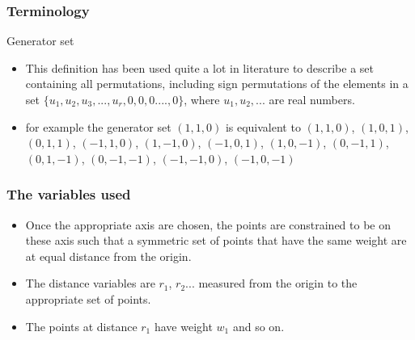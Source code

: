 \documentclass[11pt]{beamer}
\begin{document}
\begin{frame}
\frametitle{Terminology}
\begin{block}{Generator set}
\begin{itemize}[<+->]
\item This definition has been used quite a lot in literature to describe a set containing all permutations, including sign permutations of the elements in a set $\{u_1,u_2,u_3,...,u_r,0,0,0....,0\}$, where $u_1,u_2,...$ are real numbers.
\item for example the generator set $(1,1,0)$ is equivalent to $(1,1,0)$, $(1,0,1)$, $(0,1,1)$, $(-1,1,0)$, $(1,-1,0)$, $(-1,0,1)$, $(1,0,-1)$, $(0,-1,1)$, $(0,1,-1)$, $(0,-1,-1)$, $(-1,-1,0)$, $(-1,0,-1)$
\end{itemize} 
\end{block}
\end{frame}
\begin{frame}
\frametitle{The variables used}
\begin{itemize}[<+->]
\item Once the appropriate axis are chosen, the points are constrained to be on these axis such that a symmetric set of points that have the same weight are at equal distance from the origin.
\item The distance variables are $r_1$, $r_2$... measured from the origin to the appropriate set of points. 
\item The points at distance $r_1$ have weight $w_1$ and so on. 
\end{itemize}
\end{frame}
\end{document}
